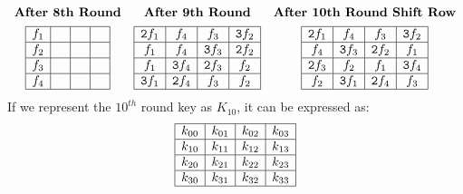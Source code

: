 \documentclass{beamer}
\newenvironment{tres important}[2][]{
	\setkeys{EmphEqEnv}{#2}
	\setkeys{EmphEqOpt}{box={\setlength{\fboxsep}{10pt}\fcolorbox{myNewColorA}{white}},#1}
	\EmphEqMainEnv}
{\endEmphEqMainEnv}
\begin{document}
\begin{frame}
    \scriptsize
    \[
\begin{array}{ccc}
    \textbf{After 8th Round} & \textbf{After 9th Round} & \textbf{After 10th Round Shift Row} \\[1ex]
    \begin{array}{|c|c|c|c|}
        \hline
        \texttt{$f_1$} & \texttt{ } & \texttt{ } &  \texttt{ }\\
        \hline
        \texttt{$f_2$} & \texttt{ } & \texttt{ } &  \texttt{ }  \\
        \hline
        \texttt{$f_3$} & \texttt{ } & \texttt{ } &  \texttt{ }  \\
        \hline
        \texttt{$f_4$}& \texttt{ } & \texttt{ } &  \texttt{ }  \\
        \hline
    \end{array}
&

\begin{array}{|c|c|c|c|}
    \hline
    \texttt{2$f_1$} & \texttt{$f_4$} & \texttt{$f_3$} & \texttt{3$f_2$} \\
    \hline
    \texttt{$f_1$} & \texttt{$f_4$} & \texttt{3$f_3$} & \texttt{2$f_2$} \\
    \hline
    \texttt{$f_1$} & \texttt{3$f_4$} & \texttt{2$f_3$} & \texttt{$f_2$} \\
    \hline
    \texttt{3$f_1$} & \texttt{2$f_4$} & \texttt{$f_3$} & \texttt{$f_2$} \\
    \hline
\end{array}

    &

    \begin{array}{|c|c|c|c|}
        \hline
        \texttt{2$f_1$} & \texttt{$f_4$} & \texttt{$f_3$} & \texttt{3$f_2$} \\
        \hline
        \texttt{$f_4$} & \texttt{3$f_3$} & \texttt{2$f_2$} & \texttt{$f_1$}\\
        \hline
        \texttt{2$f_3$} & \texttt{$f_2$} & \texttt{$f_1$} & \texttt{3$f_4$} \\
        \hline
        \texttt{$f_2$} & \texttt{3$f_1$} & \texttt{2$f_4$} & \texttt{$f_3$} \\
        \hline
    \end{array}
    
\end{array}
\]
If we represent the $10^{th}$ round key as \(K_{10}\), it can be expressed as:
\[
    \begin{array}{|c|c|c|c|}
        \hline
        k_{00} & k_{01} & k_{02} & k_{03} \\
        \hline
        k_{10} & k_{11} & k_{12} & k_{13} \\
        \hline
        k_{20} & k_{21} & k_{22} & k_{23} \\
        \hline
        k_{30} & k_{31} & k_{32} & k_{33} \\
        \hline
        \end{array}
\]
  \end{frame}
\end{document}
